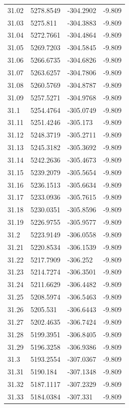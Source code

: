 \begin{table}[H]
\begin{tabular}{llll}
31.02 & 5278.8549 & -304.2902 & -9.809 \\
31.03 & 5275.811 & -304.3883 & -9.809 \\
31.04 & 5272.7661 & -304.4864 & -9.809 \\
31.05 & 5269.7203 & -304.5845 & -9.809 \\
31.06 & 5266.6735 & -304.6826 & -9.809 \\
31.07 & 5263.6257 & -304.7806 & -9.809 \\
31.08 & 5260.5769 & -304.8787 & -9.809 \\
31.09 & 5257.5271 & -304.9768 & -9.809 \\
31.1 & 5254.4764 & -305.0749 & -9.809 \\
31.11 & 5251.4246 & -305.173 & -9.809 \\
31.12 & 5248.3719 & -305.2711 & -9.809 \\
31.13 & 5245.3182 & -305.3692 & -9.809 \\
31.14 & 5242.2636 & -305.4673 & -9.809 \\
31.15 & 5239.2079 & -305.5654 & -9.809 \\
31.16 & 5236.1513 & -305.6634 & -9.809 \\
31.17 & 5233.0936 & -305.7615 & -9.809 \\
31.18 & 5230.0351 & -305.8596 & -9.809 \\
31.19 & 5226.9755 & -305.9577 & -9.809 \\
31.2 & 5223.9149 & -306.0558 & -9.809 \\
31.21 & 5220.8534 & -306.1539 & -9.809 \\
31.22 & 5217.7909 & -306.252 & -9.809 \\
31.23 & 5214.7274 & -306.3501 & -9.809 \\
31.24 & 5211.6629 & -306.4482 & -9.809 \\
31.25 & 5208.5974 & -306.5463 & -9.809 \\
31.26 & 5205.531 & -306.6443 & -9.809 \\
31.27 & 5202.4635 & -306.7424 & -9.809 \\
31.28 & 5199.3951 & -306.8405 & -9.809 \\
31.29 & 5196.3258 & -306.9386 & -9.809 \\
31.3 & 5193.2554 & -307.0367 & -9.809 \\
31.31 & 5190.184 & -307.1348 & -9.809 \\
31.32 & 5187.1117 & -307.2329 & -9.809 \\
31.33 & 5184.0384 & -307.331 & -9.809 \\

\end{tabular}
\end{table}

